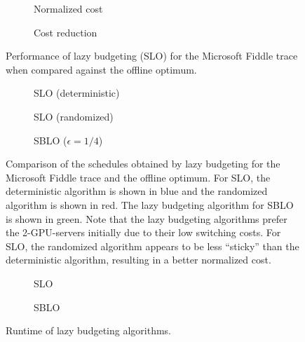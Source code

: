 \begin{figure}
    \begin{subfigure}[b]{.5\linewidth}
    \resizebox{\textwidth}{!}{}
    \caption{Normalized cost}\label{fig:case_studies:md:slo:normalized_cost}
    \end{subfigure}
    \begin{subfigure}[b]{.5\linewidth}
    \resizebox{\textwidth}{!}{}
    \caption{Cost reduction}\label{fig:case_studies:md:slo:cost_reduction}
    \end{subfigure}
    \caption{Performance of lazy budgeting (SLO) for the Microsoft Fiddle trace when compared against the offline optimum.}
\end{figure}

\begin{figure}
    \begin{subfigure}[b]{.3425\linewidth}
    \resizebox{\textwidth}{!}{}
    \caption{SLO (deterministic)}\label{fig:case_studies:md:slo:det:schedule}
    \end{subfigure}
    \begin{subfigure}[b]{.32\linewidth}
    \resizebox{\textwidth}{!}{}
    \caption{SLO (randomized)}\label{fig:case_studies:md:slo:rand:schedule}
    \end{subfigure}
    \begin{subfigure}[b]{.32\linewidth}
    \resizebox{\textwidth}{!}{}
    \caption{SBLO ($\epsilon = 1/4$)}\label{fig:case_studies:md:sblo:schedule}
    \end{subfigure}
    \caption{Comparison of the schedules obtained by lazy budgeting for the Microsoft Fiddle trace and the offline optimum. For SLO, the deterministic algorithm is shown in blue and the randomized algorithm is shown in red. The lazy budgeting algorithm for SBLO is shown in green. Note that the lazy budgeting algorithms prefer the 2-GPU-servers initially due to their low switching costs. For SLO, the randomized algorithm appears to be less ``sticky'' than the deterministic algorithm, resulting in a better normalized cost.}
\end{figure}

\begin{figure}
    \begin{subfigure}[b]{.5175\linewidth}
    \resizebox{\textwidth}{!}{}
    \caption{SLO}\label{fig:case_studies:md:slo:runtimes}
    \end{subfigure}
    \begin{subfigure}[b]{.4825\linewidth}
    \resizebox{\textwidth}{!}{}
    \caption{SBLO}\label{fig:case_studies:md:sblo:runtimes}
    \end{subfigure}
    \caption{Runtime of lazy budgeting algorithms.}
\end{figure}

